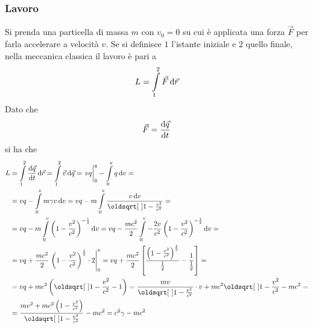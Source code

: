 \subsubsection{Lavoro}
Si prenda una particella di massa $m$ con $v_0=0$ su cui è applicata una forza $\vec{F}$ per farla
accelerare a velocità $v$. Se si definisce $1$ l'istante iniziale e $2$ quello finale, nella
meccanica classica il lavoro è pari a
\begin{equation*}
  L = \int\limits_{1}^{2} \vec{F}\mathop{}\!\mathrm{d}\vec{r}
\end{equation*}
Dato che
\begin{equation*}
  \vec{F} = \frac{\mathop{}\!\mathrm{d} \vec{q}}{\mathop{}\!\mathrm{d} t}
\end{equation*}
si ha che
\begin{align*}
  L &= \int\limits_{1}^{2} \der{\vec{q}}{t}\dif\vec{r}= \int\limits_{1}^{2}\vec{v}\dif\vec{q}=
  \left. \vphantom{\int}vq\right|_0^q-\int\limits_{0}^{v} q\dif v=\\
  &=vq-\int\limits_{0}^{v} m\gamma v\dif v=  
  vq-m \int\limits_{0}^{v} \frac{v\dif v}{\sqrt{1-\frac{v^2}{c^2}}}=\\
  &=vq-m \int\limits_{0}^{v} \left( 1-\frac{v^2}{c^2} \right)^{-\frac{1}{2}}\dif v=
  vq-\frac{mc^2}{2}
  \int\limits_{0}^{v} -\frac{2v}{c^2}\left( 1-\frac{v^2}{c^2} \right)^{-\frac{1}{2}}\dif v=\\
  &=vq+\frac{mc^2}{2}\left.\left( 1-\frac{v^2}{c^2}  \right)^{\frac{1}{2}}\cdot2\right|_0^v=
  vq+\frac{mc^2}{2} \left[ \frac{\left(1-\frac{v^2}{c^2}\right)^{\frac{1}{2}}}{\frac{1}{2}}-
  \frac{1}{\frac{1}{2}}\right]=\\
  &=vq+mc^2\left(\sqrt{1-\frac{v^2}{c^2}}-1\right)=\frac{mv}{\sqrt{1-\frac{v^2}{c^2}}}\cdot v+
  mc^2\sqrt{1-\frac{v^2}{c^2}}-mc^2=\\
  &=\frac{mv^2+mc^2\left( 1-\frac{v^2}{c^2} \right)}{\sqrt{1-\frac{v^2}{c^2}}}-mc^2=
  c^2\gamma-mc^2
\end{align*}
